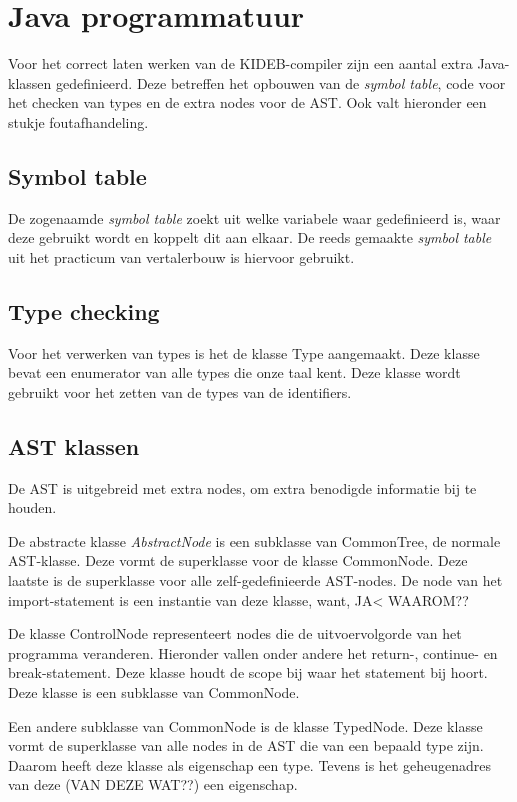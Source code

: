 \chapter{Java programmatuur} %
\label{cha:java_programmatuur}
Voor het correct laten werken van de KIDEB-compiler zijn een aantal extra Java-klassen gedefinieerd. Deze betreffen het opbouwen van de \emph{symbol table}, code voor het checken van types en de extra nodes voor de AST. Ook valt hieronder een stukje foutafhandeling.

\section{Symbol table} %
\label{sec:symbol_table}
De zogenaamde \emph{symbol table} zoekt uit welke variabele waar gedefinieerd is, waar deze gebruikt wordt en koppelt dit aan elkaar. De reeds gemaakte \emph{symbol table} uit het practicum van vertalerbouw is hiervoor gebruikt. 

\section{Type checking} %
\label{sec:type_checking}
Voor het verwerken van types is het de klasse Type aangemaakt. Deze klasse bevat een enumerator van alle types die onze taal kent. Deze klasse wordt gebruikt voor het zetten van de types van de identifiers.

\section{AST klassen} %
\label{sec:ast_klassen}
De AST is uitgebreid met extra nodes, om extra benodigde informatie bij te houden. 

De abstracte klasse \emph{AbstractNode} is een subklasse van CommonTree, de normale AST-klasse. Deze vormt de superklasse voor de klasse CommonNode. Deze laatste is de superklasse voor alle zelf-gedefinieerde AST-nodes. De node van het import-statement is een instantie van deze klasse, want, JA< WAAROM??

De klasse ControlNode representeert nodes die de uitvoervolgorde van het programma veranderen. Hieronder vallen onder andere het return-, continue- en break-statement. Deze klasse houdt de scope bij waar het statement bij hoort. Deze klasse is een subklasse van CommonNode. 

Een andere subklasse van CommonNode is de klasse TypedNode. Deze klasse vormt de superklasse van alle nodes in de AST die van een bepaald type zijn. Daarom heeft deze klasse als eigenschap een type. Tevens is het geheugenadres van deze (VAN DEZE WAT??) een eigenschap.

